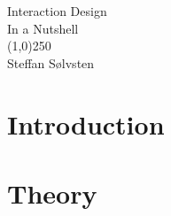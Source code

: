 \documentclass[a4, english, twoside]{article}
\begin{document}

\thispagestyle{empty} %
\begin{center}
	\phantom{}\vspace{3.1cm}
	{\Huge\sc Interaction Design}
	\\ \vspace{1em}
	{\LARGE\sc In a Nutshell}
	\\
	\line(1,0){250}
	\\ \vspace{1em}
	{\LARGE Steffan Sølvsten}
\end{center}

\BgThispage

\newpage
\thispagestyle{empty} %


\newpage
\thispagestyle{empty} %
\tableofcontents

\newpage
\setcounter{page}{1}

\section{Introduction}
\label{sec:introduction}



\newpage
\section{Theory}
\label{sec:1}













\newpage
\end{document}
